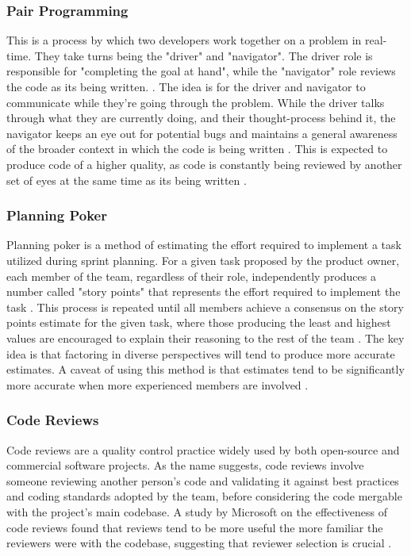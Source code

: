 \documentclass[11pt]{article}
\begin{document}
        \subsubsection{Pair Programming}
        This is a process by which two developers work together on a problem in real-time. They take turns being the "driver" and "navigator". The driver role is responsible for "completing the goal at hand", while the "navigator" role reviews the code as its being written. \citet{pairprogramming}. The idea is for the driver and navigator to communicate while they're going through the problem. While the driver talks through what they are currently doing, and their thought-process behind it, the navigator keeps an eye out for potential bugs and maintains a general awareness of the broader context in which the code is being written \citet{pairprogramming}. This is expected to produce code of a higher quality, as code is constantly being reviewed by another set of eyes at the same time as its being written \citet{pairprogramming}.
        
        \subsubsection{Planning Poker}
        Planning poker is a method of estimating the effort required to implement a task utilized during sprint planning. For a given task proposed by the product owner, each member of the team, regardless of their role, independently produces a number called "story points" that represents the effort required to implement the task \citet{planningPoker}. This process is repeated until all members achieve a consensus on the story points estimate for the given task, where those producing the least and highest values are encouraged to explain their reasoning to the rest of the team \citet{planningPoker}. The key idea is that factoring in diverse perspectives will tend to produce more accurate estimates. A caveat of using this method is that estimates tend to be significantly more accurate when more experienced members are involved \citet{planningPoker}. 
        
        \subsubsection{Code Reviews}
        Code reviews are a quality control practice widely used by both open-source and commercial software projects. As the name suggests, code reviews involve someone reviewing another person's code and validating it against best practices and coding standards adopted by the team, before considering the code mergable with the project's main codebase. A study by Microsoft on the effectiveness of code reviews found that reviews tend to be more useful the more familiar the reviewers were with the codebase, suggesting that reviewer selection is crucial \citet{codereviews}.
\end{document}

